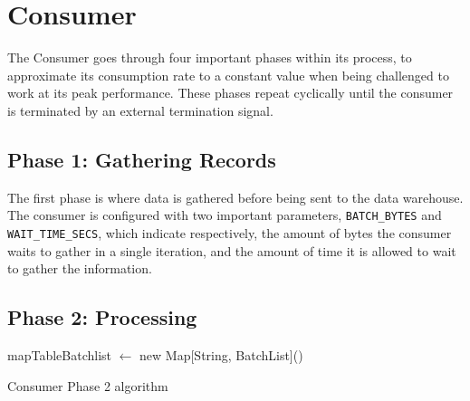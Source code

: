 \section{Consumer} \label{component:consumer}

The Consumer goes through four important phases within its process, to
approximate its consumption rate to a constant value when being challenged to
work at its peak performance. These phases repeat cyclically until the consumer
is terminated by an external termination signal. 

\subsection{Phase 1: Gathering Records}

The first phase is where data is gathered before being sent to the data
warehouse. The consumer is configured with two important parameters,
\lstinline[language=Python]{BATCH_BYTES} and
\lstinline[language=Python]{WAIT_TIME_SECS}, which indicate respectively, the
amount of bytes the consumer waits to gather in a single iteration, and the
amount of time it is allowed to wait to gather the information.

\subsection{Phase 2: Processing} \label{consumer:phase2}

\IncMargin{1em} 
\begin{algorithm}[h]
    \BlankLine

    mapTableBatchlist $\leftarrow$ new Map[String, BatchList]()\; 
\caption{Consumer Phase 2 algorithm}
\label{algo:phase_2} 
\end{algorithm} 
\DecMargin{1em}

